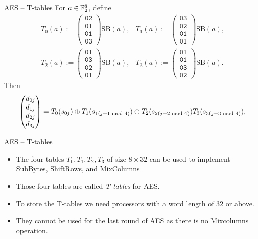 \begin{frame}{AES -- T-tables}
For $a\in{\mathbb F}_2^8$, define
\begin{equation*}
    \begin{array}{ll}
    T_0(a):=\begin{pmatrix}
    \texttt{02}\\
    \texttt{01}\\
    \texttt{01}\\
    \texttt{03}
    \end{pmatrix}\text{SB}(a), & 
    T_1(a):=\begin{pmatrix}
    \texttt{03}\\
    \texttt{02}\\
    \texttt{01}\\
    \texttt{01}
    \end{pmatrix}\text{SB}(a),\\ 
      T_2(a):=\begin{pmatrix}
    \texttt{01}\\
    \texttt{03}\\
    \texttt{02}\\
    \texttt{01}
    \end{pmatrix}\text{SB}(a), & 
    T_3(a):=\begin{pmatrix}
    \texttt{01}\\
    \texttt{01}\\
    \texttt{03}\\
    \texttt{02}
    \end{pmatrix}\text{SB}(a).
    \end{array}
\end{equation*}
Then
\[
\begin{pmatrix}
    d_{0j}\\
    d_{1j}\\
    d_{2j}\\
    d_{3j}
    \end{pmatrix}
    =T_0(s_{0j})\oplus T_1(s_{1(j+1\textrm{~mod~} 4)})
    \oplus T_2(s_{2(j+2\textrm{~mod~} 4)})T_3(s_{3(j+3\textrm{~mod~} 4)}),
\]
\end{frame}

\begin{frame}{AES -- T-tables}
    \begin{itemize}
        \item The four tables $T_0, T_1, T_2, T_3$ of size $8\times32$ can be used to implement SubBytes, ShiftRows, and MixColumns
       \item Those four tables are called \textit{T-tables} for AES.
       \item To store the T-tables we need processors with a word length of $32$ or above.
       \item They cannot be used for the last round of AES as there is no Mixcolumns operation.
    \end{itemize}
\end{frame}


